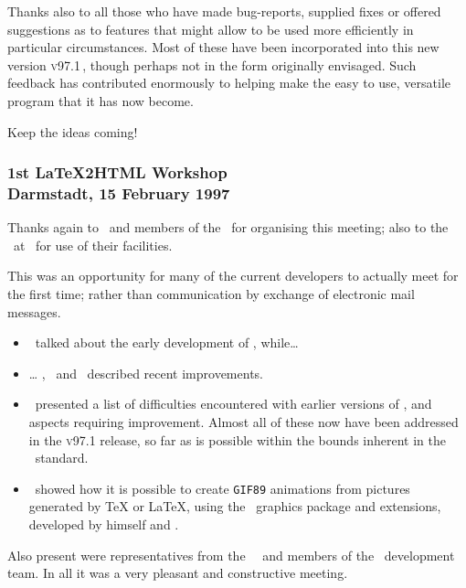 \medskip\vfil\htmlrule\bigskip\noindent
Thanks also to all those who have made bug-reports, supplied fixes 
or offered suggestions as to features that might allow \latextohtml{} 
to be used more efficiently in particular circumstances. 
Most of these have been incorporated into this new version \textsc{v97.1}\,,
though perhaps not in the form originally envisaged.
Such feedback has contributed enormously to helping make \latextohtml{} the
easy to use, versatile program that it has now become.

\bigskip
\begin{center}
Keep the ideas coming!
\end{center}
\bigskip
\vfil




\subsubsection*[center]{1st \LaTeX2HTML{} Workshop\\Darmstadt, 
15 February 1997\label{darmstadt}}
Thanks again to \Lippmann\ and members of the \LiPS\ for organising this meeting; 
also to the \FIDarmstadt\ at \Darmstadt\ for use of their facilities.

\noindent
This was an opportunity for many of the current \latextohtml{} developers to
actually meet for the first time; rather than communication by exchange
of electronic mail messages.
%
\begin{itemize}
\item
\NikosDrakos\ talked about the early development of \latextohtml, while\dots
\item \dots
\RossMoore, \Lippmann\ and \Rouchal\ described recent improvements. 
\item
\Goossens\ presented a list of difficulties encountered with earlier
versions of \latextohtml{}, and aspects requiring improvement.
Almost all of these now have been addressed in the \textsc{v97.1} release,
so far as is possible within the bounds inherent in the \HTMLiii\ standard.
\item
\KrisRose\ showed how it is possible to create \texttt{GIF89} animations 
from pictures generated by \TeX{} or \LaTeX{}, using the \XypicDK\ graphics 
package and extensions, developed by himself and \XypicAUS.
\end{itemize}

\noindent
Also present were representatives from the \DANTE\ \Praesidium\ and 
members of the \LaTeXiii\ development team.\html{\\} 
In all it was a very pleasant and constructive meeting.

